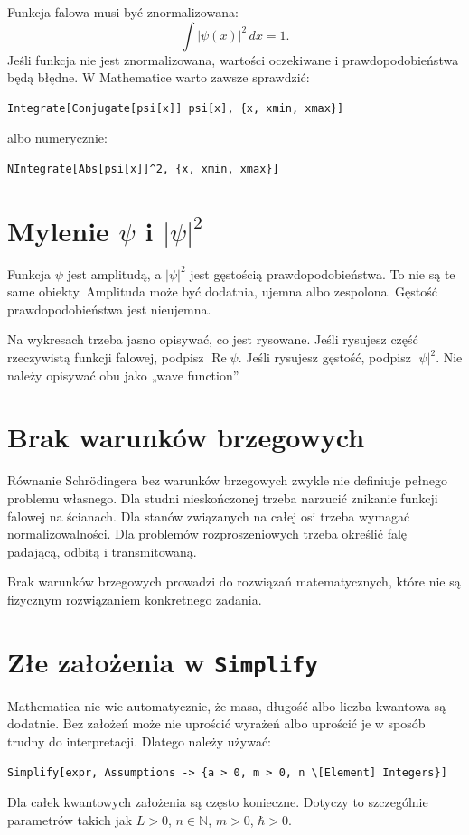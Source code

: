 Funkcja falowa musi być znormalizowana:
\begin{equation}
    \int |\psi(x)|^2\,dx=1.
\end{equation}
Jeśli funkcja nie jest znormalizowana, wartości oczekiwane i prawdopodobieństwa
będą błędne. W Mathematice warto zawsze sprawdzić:
\begin{verbatim}
Integrate[Conjugate[psi[x]] psi[x], {x, xmin, xmax}]
\end{verbatim}
albo numerycznie:
\begin{verbatim}
NIntegrate[Abs[psi[x]]^2, {x, xmin, xmax}]
\end{verbatim}

\section{Mylenie \texorpdfstring{\(\psi\)}{psi} i \texorpdfstring{\(|\psi|^2\)}{|psi|^2}}

Funkcja \(\psi\) jest amplitudą, a \(|\psi|^2\) jest gęstością
prawdopodobieństwa. To nie są te same obiekty. Amplituda może być dodatnia,
ujemna albo zespolona. Gęstość prawdopodobieństwa jest nieujemna.

Na wykresach trzeba jasno opisywać, co jest rysowane. Jeśli rysujesz część
rzeczywistą funkcji falowej, podpisz \(\operatorname{Re}\psi\). Jeśli rysujesz
gęstość, podpisz \(|\psi|^2\). Nie należy opisywać obu jako „wave function”.

\section{Brak warunków brzegowych}

Równanie Schrödingera bez warunków brzegowych zwykle nie definiuje pełnego
problemu własnego. Dla studni nieskończonej trzeba narzucić znikanie funkcji
falowej na ścianach. Dla stanów związanych na całej osi trzeba wymagać
normalizowalności. Dla problemów rozproszeniowych trzeba określić falę padającą,
odbitą i transmitowaną.

Brak warunków brzegowych prowadzi do rozwiązań matematycznych, które nie są
fizycznym rozwiązaniem konkretnego zadania.

\section{Złe założenia w \texttt{Simplify}}

Mathematica nie wie automatycznie, że masa, długość albo liczba kwantowa są
dodatnie. Bez założeń może nie uprościć wyrażeń albo uprościć je w sposób trudny
do interpretacji. Dlatego należy używać:
\begin{verbatim}
Simplify[expr, Assumptions -> {a > 0, m > 0, n \[Element] Integers}]
\end{verbatim}
Dla całek kwantowych założenia są często konieczne. Dotyczy to szczególnie
parametrów takich jak \(L>0\), \(n\in\mathbb{N}\), \(m>0\), \(\hbar>0\).

